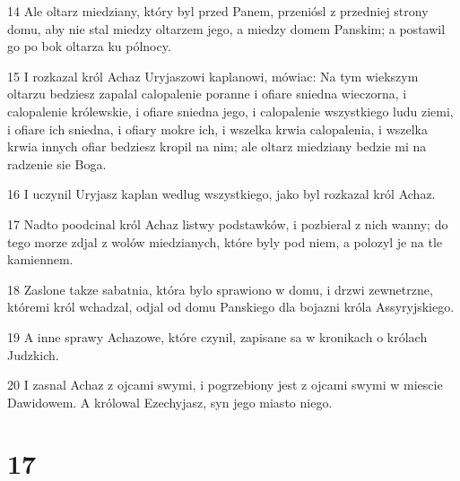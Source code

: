 \par 14 Ale oltarz miedziany, który byl przed Panem, przeniósl z przedniej strony domu, aby nie stal miedzy oltarzem jego, a miedzy domem Panskim; a postawil go po bok oltarza ku pólnocy.
\par 15 I rozkazal król Achaz Uryjaszowi kaplanowi, mówiac: Na tym wiekszym oltarzu bedziesz zapalal calopalenie poranne i ofiare sniedna wieczorna, i calopalenie królewskie, i ofiare sniedna jego, i calopalenie wszystkiego ludu ziemi, i ofiare ich sniedna, i ofiary mokre ich, i wszelka krwia calopalenia, i wszelka krwia innych ofiar bedziesz kropil na nim; ale oltarz miedziany bedzie mi na radzenie sie Boga.
\par 16 I uczynil Uryjasz kaplan wedlug wszystkiego, jako byl rozkazal król Achaz.
\par 17 Nadto poodcinal król Achaz listwy podstawków, i pozbieral z nich wanny; do tego morze zdjal z wolów miedzianych, które byly pod niem, a polozyl je na tle kamiennem.
\par 18 Zaslone takze sabatnia, która bylo sprawiono w domu, i drzwi zewnetrzne, któremi król wchadzal, odjal od domu Panskiego dla bojazni króla Assyryjskiego.
\par 19 A inne sprawy Achazowe, które czynil, zapisane sa w kronikach o królach Judzkich.
\par 20 I zasnal Achaz z ojcami swymi, i pogrzebiony jest z ojcami swymi w miescie Dawidowem. A królowal Ezechyjasz, syn jego miasto niego.

\chapter{17}


